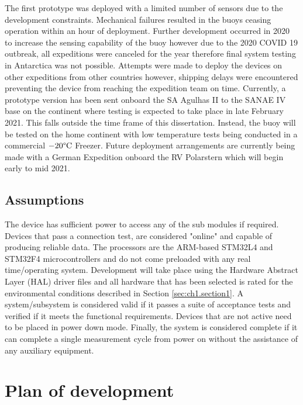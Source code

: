 The first prototype was deployed with a limited number of sensors due to the development constraints. Mechanical failures resulted in the buoys ceasing operation within an hour of deployment. Further development occurred in 2020 to increase the sensing capability of the buoy however due to the 2020 COVID 19 outbreak, all expeditions were canceled for the year therefore final system testing in Antarctica was not possible. Attempts were made to deploy the devices on other expeditions from other countries however, shipping delays were encountered preventing the device from reaching the expedition team on time. Currently, a prototype version has been sent onboard the SA Agulhas II to the SANAE IV base on the continent where testing is expected to take place in late February 2021. This falls outside the time frame of this dissertation. Instead, the buoy will be tested on the home  continent with low temperature tests being conducted in a commercial $-20\degree \text{C}$ Freezer. Future deployment arrangements are currently being made with a German Expedition onboard the RV Polarstern which will begin early to mid 2021.

\subsection{Assumptions}

The device has sufficient power to access any of the sub modules if required. Devices that pass a connection test, are considered "online" and capable of producing reliable data. The processors are the ARM-based  STM32L4 and STM32F4 microcontrollers and do not come preloaded with any real time/operating system. Development will take place using the Hardware Abstract Layer (HAL) driver files and all hardware that has been selected is rated for the environmental conditions described in Section \ref{sec:ch1.section1}. A system/subsystem is considered valid if it passes a suite of acceptance tests and verified if it meets the functional requirements. Devices that are not active need to be placed in power down mode. Finally, the system is considered complete if it can complete a single measurement cycle from power on without the assistance of any auxiliary equipment.

\section{Plan of development}
\label{sec:ch1.section3}

